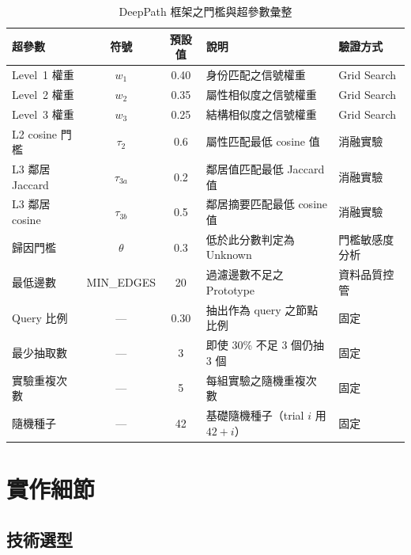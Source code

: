 \begin{ZhChapter}
\begin{table}[htbp]
    \centering
    \caption{DeepPath 框架之門檻與超參數彙整}
    \label{tab:hyperparameters}
    \renewcommand\arraystretch{1.2}
    \begin{tabular}{l c c l l}
        \hline
        \textbf{超參數} & \textbf{符號} & \textbf{預設值} & \textbf{說明} & \textbf{驗證方式} \\
        \hline
        Level~1 權重     & $w_1$      & 0.40 & 身份匹配之信號權重 & Grid Search \\
        Level~2 權重     & $w_2$      & 0.35 & 屬性相似度之信號權重 & Grid Search \\
        Level~3 權重     & $w_3$      & 0.25 & 結構相似度之信號權重 & Grid Search \\
        L2 cosine 門檻   & $\tau_2$   & 0.6  & 屬性匹配最低 cosine 值 & 消融實驗 \\
        L3 鄰居 Jaccard  & $\tau_{3a}$& 0.2  & 鄰居值匹配最低 Jaccard 值 & 消融實驗 \\
        L3 鄰居 cosine   & $\tau_{3b}$& 0.5  & 鄰居摘要匹配最低 cosine 值 & 消融實驗 \\
        歸因門檻         & $\theta$   & 0.3  & 低於此分數判定為 Unknown & 門檻敏感度分析 \\
        最低邊數         & MIN\_EDGES & 20   & 過濾邊數不足之 Prototype & 資料品質控管 \\
        Query 比例       & —          & 0.30 & 抽出作為 query 之節點比例 & 固定 \\
        最少抽取數       & —          & 3    & 即使 30\% 不足 3 個仍抽 3 個 & 固定 \\
        實驗重複次數     & —          & 5    & 每組實驗之隨機重複次數 & 固定 \\
        隨機種子         & —          & 42   & 基礎隨機種子（trial $i$ 用 $42+i$） & 固定 \\
        \hline
    \end{tabular}
\end{table}


\section{實作細節}
\label{sec:implementation}

\subsection{技術選型}


\end{ZhChapter}
